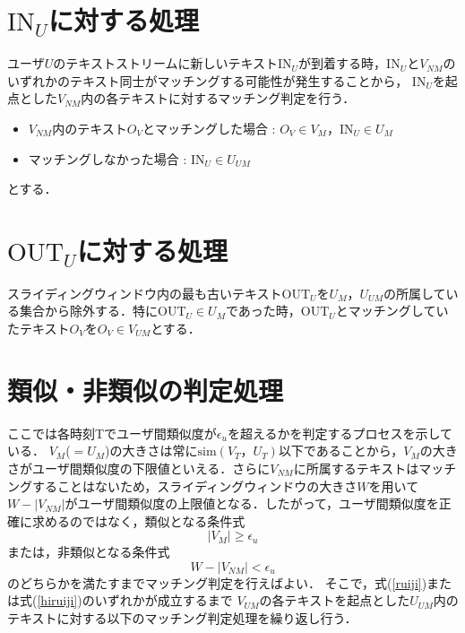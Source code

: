 \section{\texorpdfstring{$\mbox{IN}_U$}　に対する処理}
ユーザ$U$のテキストストリームに新しいテキスト$\mbox{IN}_U$が到着する時，$\mbox{IN}_U$と$V_{NM}$のいずれかのテキスト同士がマッチングする可能性が発生することから，
$\mbox{IN}_U$を起点とした$V_{NM}$内の各テキストに対するマッチング判定を行う．
\begin{itemize}
    \item $V_{NM}$内のテキスト$O_V$とマッチングした場合 : $O_V \in V_{M}，\mbox{IN}_U \in U_{M}$
    \item マッチングしなかった場合 : $\mbox{IN}_U \in U_{UM}$
\end{itemize}
とする．

\section{\texorpdfstring{$\mbox{OUT}_U$}　に対する処理}
スライディングウィンドウ内の最も古いテキスト$\mbox{OUT}_U$を$U_M，U_{UM}$の所属している集合から除外する．特に$\mbox{OUT}_U \in U_M$であった時，$\mbox{OUT}_U$とマッチングしていたテキスト$O_V$を$O_V \in V_{UM}$とする．

\section{類似・非類似の判定処理}
ここでは各時刻Tでユーザ間類似度が$\epsilon_u$を超えるかを判定するプロセスを示している．
$V_{M}$($=U_{M}$)の大きさは常に$\mbox{sim}(V_{T}，U_{T})$以下であることから，$V_{M}$の大きさがユーザ間類似度の下限値といえる．さらに$V_{NM}$に所属するテキストはマッチングすることはないため，スライディングウィンドウの大きさ$W$を用いて$W-|V_{NM}|$がユーザ間類似度の上限値となる．したがって，ユーザ間類似度を正確に求めるのではなく，類似となる条件式
\begin{equation}
\label{ruiji}
|V_{M}| \geq \epsilon_u
\end{equation}
または，非類似となる条件式
\begin{equation}
\label{hiruiji}
W - |V_{NM}| < \epsilon_u
\end{equation}
のどちらかを満たすまでマッチング判定を行えばよい．
そこで，式(\ref{ruiji})または式(\ref{hiruiji})のいずれかが成立するまで
$V_{UM}$の各テキストを起点とした$U_{UM}$内のテキストに対する以下のマッチング判定処理を繰り返し行う．

